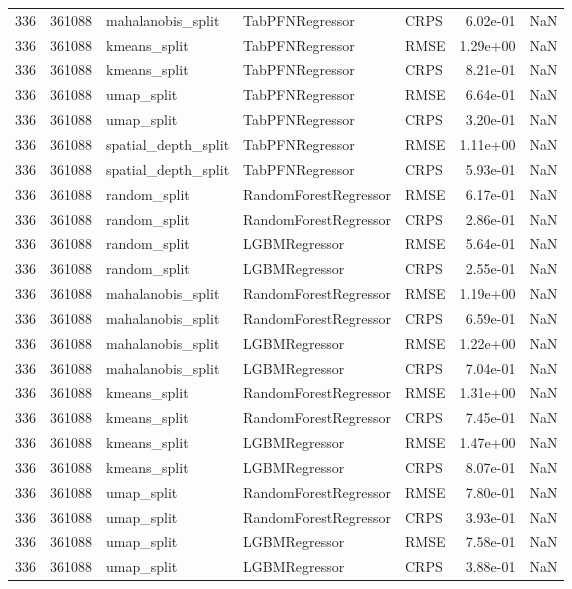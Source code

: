 \begin{tabular}{rrlllrr}
336 & 361088 & mahalanobis\_split & TabPFNRegressor & CRPS & 6.02e-01 & NaN \\
336 & 361088 & kmeans\_split & TabPFNRegressor & RMSE & 1.29e+00 & NaN \\
336 & 361088 & kmeans\_split & TabPFNRegressor & CRPS & 8.21e-01 & NaN \\
336 & 361088 & umap\_split & TabPFNRegressor & RMSE & 6.64e-01 & NaN \\
336 & 361088 & umap\_split & TabPFNRegressor & CRPS & 3.20e-01 & NaN \\
336 & 361088 & spatial\_depth\_split & TabPFNRegressor & RMSE & 1.11e+00 & NaN \\
336 & 361088 & spatial\_depth\_split & TabPFNRegressor & CRPS & 5.93e-01 & NaN \\
336 & 361088 & random\_split & RandomForestRegressor & RMSE & 6.17e-01 & NaN \\
336 & 361088 & random\_split & RandomForestRegressor & CRPS & 2.86e-01 & NaN \\
336 & 361088 & random\_split & LGBMRegressor & RMSE & 5.64e-01 & NaN \\
336 & 361088 & random\_split & LGBMRegressor & CRPS & 2.55e-01 & NaN \\
336 & 361088 & mahalanobis\_split & RandomForestRegressor & RMSE & 1.19e+00 & NaN \\
336 & 361088 & mahalanobis\_split & RandomForestRegressor & CRPS & 6.59e-01 & NaN \\
336 & 361088 & mahalanobis\_split & LGBMRegressor & RMSE & 1.22e+00 & NaN \\
336 & 361088 & mahalanobis\_split & LGBMRegressor & CRPS & 7.04e-01 & NaN \\
336 & 361088 & kmeans\_split & RandomForestRegressor & RMSE & 1.31e+00 & NaN \\
336 & 361088 & kmeans\_split & RandomForestRegressor & CRPS & 7.45e-01 & NaN \\
336 & 361088 & kmeans\_split & LGBMRegressor & RMSE & 1.47e+00 & NaN \\
336 & 361088 & kmeans\_split & LGBMRegressor & CRPS & 8.07e-01 & NaN \\
336 & 361088 & umap\_split & RandomForestRegressor & RMSE & 7.80e-01 & NaN \\
336 & 361088 & umap\_split & RandomForestRegressor & CRPS & 3.93e-01 & NaN \\
336 & 361088 & umap\_split & LGBMRegressor & RMSE & 7.58e-01 & NaN \\
336 & 361088 & umap\_split & LGBMRegressor & CRPS & 3.88e-01 & NaN \\

\end{tabular}
